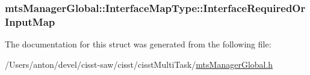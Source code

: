 \subsubsection[{Interface\+Required\+Or\+Input\+Map}]{ mts\+Manager\+Global\+::\+Interface\+Map\+Type\+::\+Interface\+Required\+Or\+Input\+Map}\label{structmts_manager_global_1_1_interface_map_type_a455b80cd0b508438ad1ddba4eabf341c}


The documentation for this struct was generated from the following file\+:\begin{DoxyCompactItemize}
\item 
/\+Users/anton/devel/cisst-\/saw/cisst/cisst\+Multi\+Task/\hyperlink{mts_manager_global_8h}{mts\+Manager\+Global.\+h}\end{DoxyCompactItemize}
